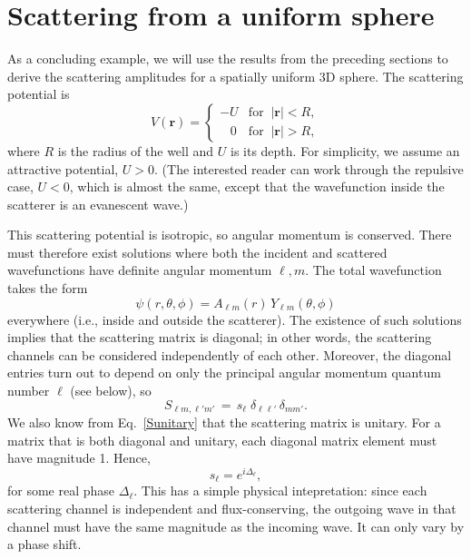 \documentclass[prx,12pt]{revtex4-2}
\begin{document}
\section{Scattering from a uniform sphere}
\label{sec:sphere}

As a concluding example, we will use the results from the preceding
sections to derive the scattering amplitudes for a spatially uniform
3D sphere.  The scattering potential is
\begin{equation}
  V(\mathbf{r}) = \begin{cases}-U &\mathrm{for}\;\; |\mathbf{r}| < R, \\
    \;\;\; 0 & \mathrm{for}\;\; |\mathbf{r}| > R,\end{cases}
  \label{vsphere}
\end{equation}
where $R$ is the radius of the well and $U$ is its depth.  For
simplicity, we assume an attractive potential, $U > 0$.  (The
interested reader can work through the repulsive case, $U < 0$, which
is almost the same, except that the wavefunction inside the scatterer
is an evanescent wave.)

This scattering potential is isotropic, so angular momentum is
conserved.  There must therefore exist solutions where both the
incident and scattered wavefunctions have definite angular momentum
$\ell, m$.  The total wavefunction takes the form
\begin{equation}
  \psi(r,\theta,\phi) = A_{\ell m}(r) \, Y_{\ell m}(\theta, \phi)
  \label{sphere_ansatz0}
\end{equation}
everywhere (i.e., inside and outside the scatterer).  The existence of
such solutions implies that the scattering matrix is diagonal; in
other words, the scattering channels can be considered independently
of each other.  Moreover, the diagonal entries turn out to depend on
only the principal angular momentum quantum number $\ell$ (see below),
so
\begin{equation}
  S_{\ell m, \ell' m'} \,=\, s_{\ell} \; \delta_{\ell \ell'} \, \delta_{mm'}.
  \label{Sdiagonal}
\end{equation}
We also know from Eq.~\eqref{Sunitary} that the scattering matrix is
unitary.  For a matrix that is both diagonal and unitary, each
diagonal matrix element must have magnitude 1.  Hence,
\begin{equation}
  s_{\ell} = e^{i\Delta_{\ell}},
  \label{sell}
\end{equation}
for some real phase $\Delta_{\ell}$.  This has a simple physical
intepretation: since each scattering channel is independent and
flux-conserving, the outgoing wave in that channel must have the same
magnitude as the incoming wave.  It can only vary by a phase shift.
\end{document}
